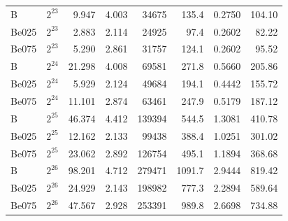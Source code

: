 \begin{tabular}{llrrrrrr}
B & $2^{23}$ & 9.947 & 4.003 & 34675 & 135.4 & 0.2750 & 104.10 \\
Be025 & $2^{23}$ & 2.883 & 2.114 & 24925 & 97.4 & 0.2602 & 82.22 \\
Be075 & $2^{23}$ & 5.290 & 2.861 & 31757 & 124.1 & 0.2602 & 95.52 \\
B & $2^{24}$ & 21.298 & 4.008 & 69581 & 271.8 & 0.5660 & 205.86 \\
Be025 & $2^{24}$ & 5.929 & 2.124 & 49684 & 194.1 & 0.4442 & 155.72 \\
Be075 & $2^{24}$ & 11.101 & 2.874 & 63461 & 247.9 & 0.5179 & 187.12 \\
B & $2^{25}$ & 46.374 & 4.412 & 139394 & 544.5 & 1.3081 & 410.78 \\
Be025 & $2^{25}$ & 12.162 & 2.133 & 99438 & 388.4 & 1.0251 & 301.02 \\
Be075 & $2^{25}$ & 23.062 & 2.892 & 126754 & 495.1 & 1.1894 & 368.68 \\
B & $2^{26}$ & 98.201 & 4.712 & 279471 & 1091.7 & 2.9444 & 819.42 \\
Be025 & $2^{26}$ & 24.929 & 2.143 & 198982 & 777.3 & 2.2894 & 589.64 \\
Be075 & $2^{26}$ & 47.567 & 2.928 & 253391 & 989.8 & 2.6698 & 734.88 \\
\hline
\end{tabular}
